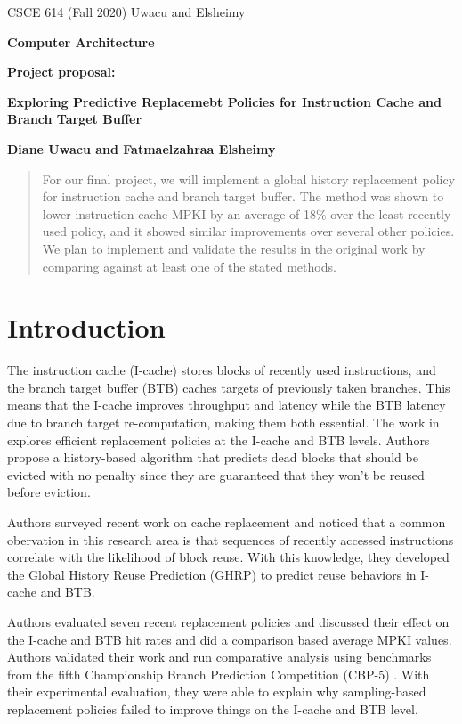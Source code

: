 \documentclass[11pt]{article}
\begin{document}
\centerline{CSCE 614 (Fall 2020) \hfill Uwacu and Elsheimy}
\medskip
\centerline{\bf Computer Architecture}
\medskip

\centerline{\bf  Project proposal: }

\bigskip

\centerline{\bf Exploring Predictive Replacemebt Policies for Instruction Cache and Branch Target Buffer}

\bigskip

\centerline{\bf Diane Uwacu and Fatmaelzahraa Elsheimy}

\bigskip

\begin{abstract}
	For our final project, we will implement a global history replacement policy for instruction cache and branch target buffer.
	The method was shown to lower instruction cache MPKI by an average of 18\% over the least recently-used policy, and it showed
	similar improvements over several other policies.
	We plan to implement and validate the results in the original work by comparing against at least one of the stated methods.
\end{abstract}

\section{Introduction} 
\label{sec:introduction}

The instruction cache (I-cache) stores blocks of recently used instructions, and the branch target buffer (BTB) caches targets of previously taken branches. 
This means that the I-cache improves throughput and latency while the BTB latency due to branch target re-computation, making them both essential.
The work in \cite{samira-ISCA18} explores efficient replacement policies at the I-cache and BTB levels. Authors propose a history-based algorithm that predicts
dead blocks that should be evicted with no penalty since they are guaranteed that they won't be reused before eviction.

Authors surveyed recent work on cache replacement and noticed that a common obervation in this research area is that sequences of recently accessed instructions
correlate with the likelihood of block reuse. With this knowledge, they developed the Global History Reuse Prediction (GHRP) to predict reuse behaviors in I-cache and BTB.

Authors evaluated seven recent replacement policies and discussed their effect on the I-cache and BTB hit rates and did a comparison based average MPKI values.
Authors validated their work and run comparative analysis using benchmarks from the fifth Championship Branch Prediction Competition (CBP-5) \cite{cbp-5}.
With their experimental evaluation, they were able to explain why sampling-based replacement policies failed to improve things on the I-cache and BTB level.
\end{document}
